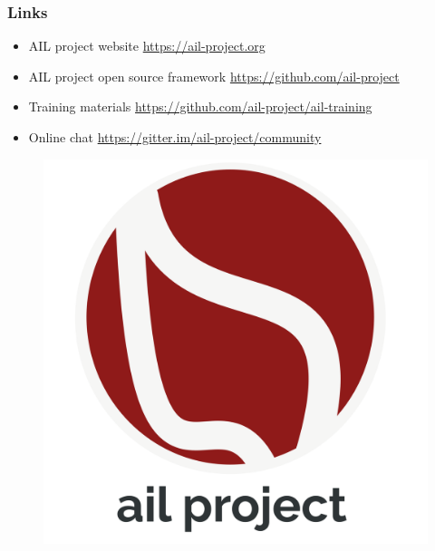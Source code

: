 \documentclass{beamer}
\begin{document}
\begin{frame}
\frametitle{Links}
    \begin{itemize}
        \item AIL project website \url{https://ail-project.org}
        \item AIL project open source framework \url{https://github.com/ail-project}
        \item Training materials \url{https://github.com/ail-project/ail-training}
        \item Online chat \url{https://gitter.im/ail-project/community}
    \end{itemize}
    \begin{figure}
        \includegraphics[scale=0.1, angle=0]{images/ail-project.png}
    \end{figure}
\end{frame}
\end{document}
